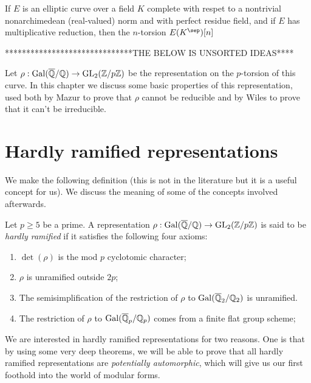 \begin{corollary}
\begin{corollary}\label{multiplicative_reduction_torsion} If $E$ is an elliptic curve
  over a field $K$ complete with respet to a nontrivial nonarchimedean (real-valued) norm
  and with perfect residue field, and if $E$ has multiplicative reduction, then the $n$-torsion
  $E(K^\sep)[n]$ 

******************************THE BELOW IS UNSORTED IDEAS****

Let $\rho:\operatorname{Gal}(\overline{\mathbb{Q}}/\mathbb{Q})\to\operatorname{GL}_2(\mathbb{Z}/p\mathbb{Z})$ be the representation on the $p$-torsion of this curve. In this chapter we discuss some basic properties of this representation, used both by Mazur to prove that $\rho$ cannot be reducible and by Wiles to prove that it can't be irreducible.

\section{Hardly ramified representations}

We make the following definition (this is not in the literature but it is a useful concept for us). We discuss the meaning of some of the concepts involved afterwards.

\begin{definition}\label{hardly_ramified} Let $p\geq5$ be a prime. A representation $\rho: \operatorname{Gal}(\overline{\mathbb{Q}}/\mathbb{Q})\to \operatorname{GL}_2(\mathbb{Z}/p\mathbb{Z})$ is said to be \emph{hardly ramified} if it satisfies the following four axioms:
  \begin{enumerate}
  \item $\det(\rho)$ is the mod $p$ cyclotomic character;
  \item $\rho$ is unramified outside $2p$;
  \item The semisimplification of the restriction of $\rho$ to $\operatorname{Gal}(\overline{\mathbb{Q}}_2/\mathbb{Q}_2)$ is unramified.
  \item The restriction of $\rho$ to $\operatorname{Gal}(\overline{\mathbb{Q}}_p/\mathbb{Q}_p)$ comes from a finite flat group scheme;
  \end{enumerate}
\end{definition}

We are interested in hardly ramified representations for two reasons. One is that by using some very deep theorems, we will be able to prove that all hardly ramified representations are \emph{potentially automorphic}, which will give us our first foothold into the world of modular forms.


\end{corollary}
\end{corollary}
